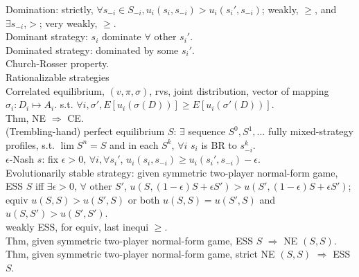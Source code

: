 \documentclass[paper=a4, fontsize=11pt]{scrartcl} %
\numberwithin{equation}{section} %
\numberwithin{figure}{section} %
\numberwithin{table}{section} %
\begin{document}
Domination: strictly, $\forall s_{-i}\in S_{-i}, u_i(s_i,s_{-i})>u_i(s_i',s_{-i})$; weakly, $\geq$, and $\exists s_{-i}$,$>$; very weakly, $\geq$.\\
Dominant strategy: $s_i$ dominate $\forall$ other $s_i'$.\\
Dominated strategy: dominated by some $s_i'$.\\
Church-Rosser property.\\
Rationalizable strategies\\
Correlated equilibrium, $(v,\pi,\sigma)$, rvs, joint distribution, vector of mapping $\sigma_i:D_i\mapsto A_i$. s.t. $\forall i,\sigma', E[u_i(\sigma(D))] \geq E[u_i(\sigma'(D))]$.\\
Thm, NE $\Rightarrow$ CE.\\
(Trembling-hand) perfect equilibrium $S$: $\exists$ sequence $S^0,S^1,...$ fully mixed-strategy profiles, s.t. $\lim S^n = S$ and in each $S^k$, $\forall i$ $s_i$ is BR to $s_{-i}^k$.\\
$\epsilon$-Nash $s$: fix $\epsilon>0$, $\forall i,\forall s_i'$, $u_i(s_i,s_{-i})\geq u_i(s_i',s_{-i}) - \epsilon$.\\
Evolutionarily stable strategy: given symmetric two-player normal-form game, ESS $S$ iff $\exists\epsilon>0$, $\forall$ other $S'$, $u(S,(1-\epsilon)S+\epsilon S')>u(S',(1-\epsilon)S+\epsilon S')$; equiv $u(S,S)>u(S',S)$ or both $u(S,S)=u(S',S)$ and $u(S,S')>u(S',S')$.\\
weakly ESS, for equiv, last inequi $\geq$.\\
Thm, given symmetric two-player normal-form game, ESS $S$ $\Rightarrow$ NE $(S,S)$.\\
Thm, given symmetric two-player normal-form game, strict NE $(S,S)$ $\Rightarrow$ ESS $S$.
\end{document}
